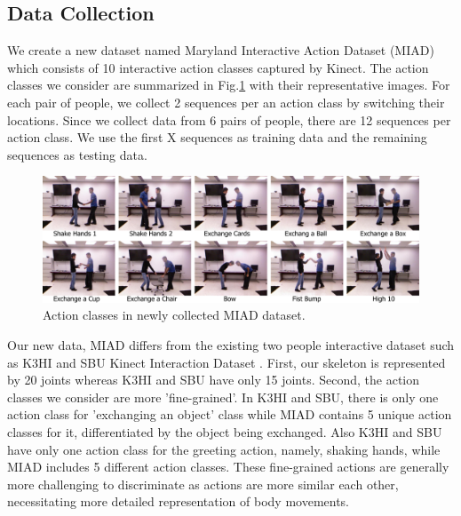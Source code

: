 \documentclass[10pt,twocolumn,letterpaper]{article}
\begin{document}
\subsection{Data Collection}

We create a new dataset named Maryland Interactive Action Dataset (MIAD) which consists of 10 interactive action classes captured by Kinect. The action classes we consider are summarized in Fig.\ref{fig:newactions} with their representative images. For each pair of people, we collect 2 sequences per an action class by switching their locations. Since we collect data from 6 pairs of people, there are 12 sequences per action class. We use the first X sequences as training data and the remaining sequences as testing data.

\begin{figure}[htb]
\begin{center}
\includegraphics[width=6.8in]{newactions.pdf}
\caption{Action classes in newly collected MIAD dataset.  \label{fig:newactions}}
\end{center}
\end{figure}

Our new data, MIAD differs from the existing two people interactive dataset such as K3HI \cite{K3HI} and SBU Kinect Interaction Dataset \cite{Yun2012}. First, our skeleton is represented by 20 joints whereas K3HI and SBU have only 15 joints. Second, the action classes we consider are more 'fine-grained'. In K3HI and SBU, there is only one action class for 'exchanging an object' class while MIAD contains 5 unique action classes for it, differentiated by the object being exchanged. Also K3HI and SBU have only one action class for the greeting action, namely, shaking hands, while MIAD includes 5 different action classes. These fine-grained actions are generally more challenging to discriminate as actions are more similar each other, necessitating more detailed representation of body movements.


\end{document}

